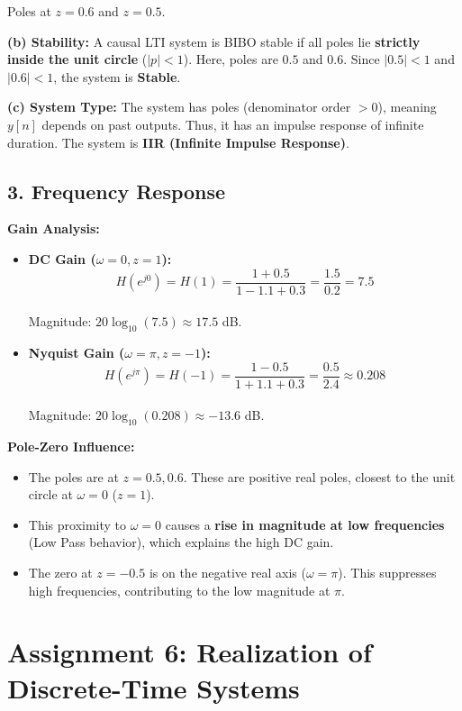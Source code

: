 \documentclass[11pt, a4paper]{article}
\begin{document}
Poles at $z = 0.6$ and $z = 0.5$.

\textbf{(b) Stability:}
A causal LTI system is BIBO stable if all poles lie \textbf{strictly inside the unit circle} ($|p| < 1$).
Here, poles are $0.5$ and $0.6$.
Since $|0.5| < 1$ and $|0.6| < 1$, the system is \textbf{Stable}.

\textbf{(c) System Type:}
The system has poles (denominator order $> 0$), meaning $y[n]$ depends on past outputs. Thus, it has an impulse response of infinite duration. The system is \textbf{IIR (Infinite Impulse Response)}.

\subsection{3. Frequency Response}
\textbf{Gain Analysis:}
\begin{itemize}
    \item \textbf{DC Gain ($\omega = 0, z = 1$):} \\
    $$H(e^{j0}) = H(1) = \frac{1 + 0.5}{1 - 1.1 + 0.3} = \frac{1.5}{0.2} = 7.5$$ \\
    Magnitude: $20 \log_{10}(7.5) \approx 17.5$ dB.
    
    \item \textbf{Nyquist Gain ($\omega = \pi, z = -1$):} \\
    $$H(e^{j\pi}) = H(-1) = \frac{1 - 0.5}{1 + 1.1 + 0.3} = \frac{0.5}{2.4} \approx 0.208$$ \\
    Magnitude: $20 \log_{10}(0.208) \approx -13.6$ dB.
\end{itemize}

\textbf{Pole-Zero Influence:}
\begin{itemize}
    \item The poles are at $z=0.5, 0.6$. These are positive real poles, closest to the unit circle at $\omega=0$ ($z=1$).
    \item This proximity to $\omega=0$ causes a \textbf{rise in magnitude at low frequencies} (Low Pass behavior), which explains the high DC gain.
    \item The zero at $z=-0.5$ is on the negative real axis ($\omega=\pi$). This suppresses high frequencies, contributing to the low magnitude at $\pi$.
\end{itemize}

\newpage
\section{Assignment 6: Realization of Discrete-Time Systems}
\end{document}
